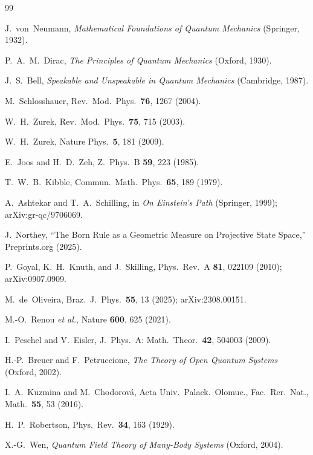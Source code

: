 \documentclass[aps,prd,reprint,superscriptaddress,twocolumn]{revtex4-2}
\begin{document}
\begin{thebibliography}{99}

 J.~von~Neumann, \textit{Mathematical Foundations of Quantum Mechanics} (Springer, 1932).

 P.~A.~M.~Dirac, \textit{The Principles of Quantum Mechanics} (Oxford, 1930).

 J.~S.~Bell, \textit{Speakable and Unspeakable in Quantum Mechanics} (Cambridge, 1987).

 M.~Schlosshauer, Rev.~Mod.~Phys.~\textbf{76}, 1267 (2004).

 W.~H.~Zurek, Rev.~Mod.~Phys.~\textbf{75}, 715 (2003).

 W.~H.~Zurek, Nature Phys.~\textbf{5}, 181 (2009).

 E.~Joos and H.~D.~Zeh, Z.~Phys.~B \textbf{59}, 223 (1985).

 T.~W.~B.~Kibble, Commun.~Math.~Phys.~\textbf{65}, 189 (1979).

 A.~Ashtekar and T.~A.~Schilling, in \textit{On Einstein's Path} (Springer, 1999); arXiv:gr-qc/9706069.

 J.~Northey, ``The Born Rule as a Geometric Measure on Projective State Space,'' Preprints.org (2025).

 P.~Goyal, K.~H.~Knuth, and J.~Skilling, Phys.~Rev.~A \textbf{81}, 022109 (2010); arXiv:0907.0909.

 M.~de~Oliveira, Braz.~J.~Phys.~\textbf{55}, 13 (2025); arXiv:2308.00151.

 M.-O.~Renou \textit{et al.}, Nature \textbf{600}, 625 (2021).

 I.~Peschel and V.~Eisler, J.~Phys.~A: Math.~Theor.~\textbf{42}, 504003 (2009).

 H.-P.~Breuer and F.~Petruccione, \textit{The Theory of Open Quantum Systems} (Oxford, 2002).

 I.~A.~Kuzmina and M.~Chodorov\'{a}, Acta Univ.~Palack.~Olomuc., Fac.~Rer.~Nat., Math.~\textbf{55}, 53 (2016).

 H.~P.~Robertson, Phys.~Rev.~\textbf{34}, 163 (1929).

 X.-G.~Wen, \textit{Quantum Field Theory of Many-Body Systems} (Oxford, 2004).


\end{thebibliography}
\end{document}

